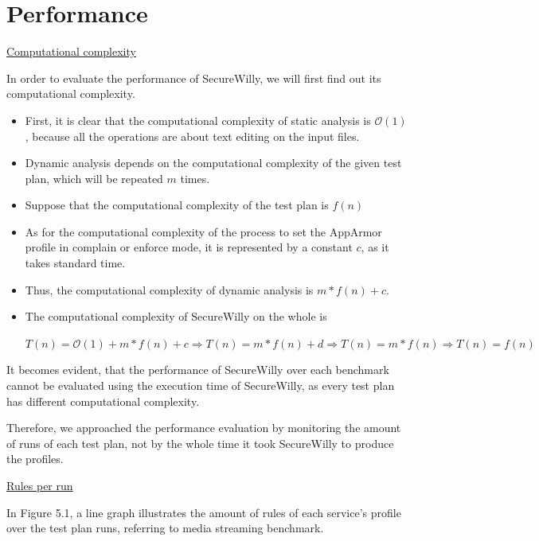 \section{Performance}

\underline{Computational complexity}
\hfill\break

In order to evaluate the performance of SecureWilly, we will first find out its computational complexity.

\begin{itemize}
\item First, it is clear that the computational complexity of static analysis is $\mathcal{O}(1)$, because all the operations are about text editing on the input files.
\item Dynamic analysis depends on the computational complexity of the given test plan, which will be repeated $m$ times.

\item Suppose that the computational complexity of the test plan is $f(n)$

\item As for the computational complexity of the process to set the AppArmor profile in complain or enforce mode, it is represented by a constant $c$, as it takes standard time.

\item Thus, the computational complexity of dynamic analysis is $m*f(n) + c$.

\item The computational complexity of SecureWilly on the whole is

$T(n) = \mathcal{O}(1) + m*f(n) + c \Rightarrow T(n) = m*f(n) + d \Rightarrow T(n) = m*f(n) \Rightarrow T(n) = f(n)$

\end{itemize}

It becomes evident, that the performance of SecureWilly over each benchmark cannot be evaluated using the execution time of SecureWilly, as every test plan has different computational complexity.

Therefore, we approached the performance evaluation by monitoring the amount of runs of each test plan, not by the whole time it took SecureWilly to produce the profiles.

\hfill\break
\underline{Rules per run}
\hfill\break

In Figure 5.1, a line graph illustrates the amount of rules of each service's profile over the test plan runs, referring to media streaming benchmark.

